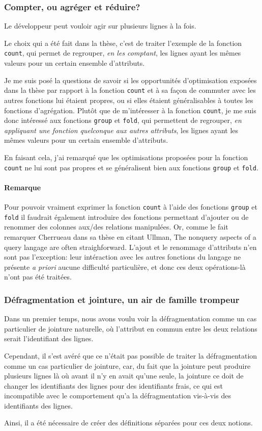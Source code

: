\subsubsection*{Compter, ou agréger et réduire?}
Le développeur peut vouloir agir sur plusieurs lignes à la fois.

Le choix qui a été fait dans la thèse, c'est de traiter l'exemple
de la fonction \lstinline|count|, qui permet de regrouper, \emph{en les comptant},
les lignes ayant les mêmes valeurs pour un certain ensemble d'attributs.

Je me suis posé la questions de savoir si les opportunités d'optimisation
exposées dans la thèse par rapport à la fonction \lstinline|count| et à sa façon de commuter
avec les autres fonctions lui étaient propres, ou si elles étaient généralisables
à toutes les fonctions d'agrégation. Plutôt que de m'intéresser à la fonction
\lstinline|count|, je me suis donc intéressé
aux fonctions \lstinline|group| et \lstinline|fold|, qui permettent
de regrouper, \emph{en appliquant une fonction quelconque aux autres attributs},
les lignes ayant les mêmes valeurs pour un certain ensemble d'attributs.

En faisant cela, j'ai remarqué que les optimisations proposées pour la fonction
\lstinline|count| ne lui sont pas propres et se généralisent bien aux
fonctions \lstinline|group| et \lstinline|fold|.

\paragraph*{Remarque}
Pour pouvoir vraiment exprimer la fonction \lstinline|count|
à l'aide des fonctions \lstinline|group| et \lstinline|fold|
il faudrait également introduire des fonctions permettant d'ajouter ou de
renommer des colonnes aux/des relations manipulées.
Or, comme le fait remarquer Cherrueau dans sa thèse en citant Ullman,
\og The nonquery aspects of a query langage are often straighforward\fg{}.
L'ajout et le renommage d'attributs n'en sont pas l'exception:
leur intéraction avec les autres fonctions du langage ne présente
\emph{a priori} aucune difficulté particulière, et donc ces deux opérations-là
n'ont pas été traitées.

\subsubsection*{Défragmentation et jointure, un air de famille trompeur}
Dans un premier temps, nous avons voulu voir la défragmentation comme un cas
particulier de jointure naturelle, où l'attribut en commun entre
les deux relations serait l'identifiant
des lignes.

Cependant, il s'est avéré que ce n'était pas possible de traiter la défragmentation
comme un cas particulier de jointure, car, du fait que la jointure
peut produire plusieurs lignes là où avant il n'y en avait qu'une seule,
la jointure ce doit de changer les identifiants des lignes pour des identifiants frais,
ce qui est incompatible avec le comportement qu'a la défragmentation
vis-à-vis des identifiants des lignes.

Ainsi, il a été nécessaire de créer des définitions séparées pour ces deux notions.
